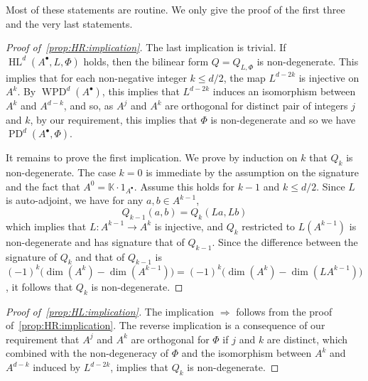 \documentclass[11pt]{amsart}
\theoremstyle{definition}
\numberwithin{equation}{section}
\renewcommand{\~}{\widetilde}
\newcommand{\bul}{\bullet} %
\DeclareMathOperator{\HL}{HL} %
\DeclareMathOperator{\WPD}{WPD} %
\DeclareMathOperator{\PD}{PD} %
\newcommand{\corps}{\mathbb K} %
\begin{document}
Most of these statements are routine. We only give the proof of the first three and the very last statements.
\begin{proof}[Proof of~\eqref{prop:HR:implication}]
The last implication is trivial. If $\HL^d(A^\bul, L, \Phi)$ holds, then the bilinear form $Q=Q_{L, \Phi}$ is non-degenerate. This implies that for each non-negative integer $k \leq d/2$, the map $L^{d-2k}$ is injective on $A^k$. By $\WPD^d(A^\bul)$, this implies that $L^{d-2k}$ induces an isomorphism between $A^k$ and $A^{d-k}$, and so, as $A^j$ and $A^k$ are orthogonal for distinct pair of integers $j$ and $k$, by our requirement, this implies that $\Phi$ is non-degenerate and so we have $\PD^d(A^\bul, \Phi)$.

It remains to prove the first implication. We prove by induction on $k$ that $Q_k$ is non-degenerate. The case $k=0$ is immediate by the assumption on the signature and the fact that $A^0 =\corps\cdot 1_{A^\bul}$. Assume this holds for $k-1$ and $k \leq d/2$. Since $L$ is auto-adjoint, we have for any $a,b \in A^{k-1}$,
\[Q_{k-1}(a,b) = Q_{k}(La,Lb)\]
which implies that $L\colon A^{k-1} \to A^k$ is injective, and $Q_k$ restricted to $L(A^{k-1})$ is non-degenerate and has signature that of $Q_{k-1}$. Since the difference between the signature of $Q_k$ and that of $Q_{k-1}$ is $(-1)^k \bigl(\dim(A^k) - \dim(A^{k-1})\bigr) = (-1)^k \bigl(\dim(A^k) - \dim(LA^{k-1})\bigr)$, it follows that $Q_k$ is non-degenerate.
\end{proof}
\begin{proof}[Proof of~\eqref{prop:HL:implication}] The implication $\Rightarrow$ follows from the proof of~\eqref{prop:HR:implication}. The reverse implication is a consequence of our requirement that $A^j$ and $A^k$ are orthogonal for $\Phi$ if $j$ and $k$ are distinct, which combined with the non-degeneracy of $\Phi$ and the isomorphism between $A^k$ and $A^{d-k}$ induced by $L^{d-2k}$, implies that $Q_k$ is non-degenerate.
\end{proof}
\end{document}
